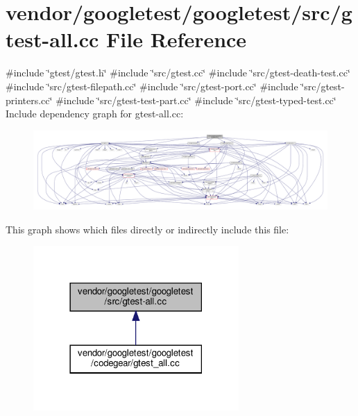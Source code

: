 \hypertarget{gtest-all_8cc}{}\section{vendor/googletest/googletest/src/gtest-\/all.cc File Reference}
\label{gtest-all_8cc}
{\ttfamily \#include \char`\"{}gtest/gtest.\+h\char`\"{}}\newline
{\ttfamily \#include \char`\"{}src/gtest.\+cc\char`\"{}}\newline
{\ttfamily \#include \char`\"{}src/gtest-\/death-\/test.\+cc\char`\"{}}\newline
{\ttfamily \#include \char`\"{}src/gtest-\/filepath.\+cc\char`\"{}}\newline
{\ttfamily \#include \char`\"{}src/gtest-\/port.\+cc\char`\"{}}\newline
{\ttfamily \#include \char`\"{}src/gtest-\/printers.\+cc\char`\"{}}\newline
{\ttfamily \#include \char`\"{}src/gtest-\/test-\/part.\+cc\char`\"{}}\newline
{\ttfamily \#include \char`\"{}src/gtest-\/typed-\/test.\+cc\char`\"{}}\newline
Include dependency graph for gtest-\/all.cc\+:
\nopagebreak
\begin{figure}[H]
\begin{center}
\leavevmode
\includegraphics[width=350pt]{gtest-all_8cc__incl}
\end{center}
\end{figure}
This graph shows which files directly or indirectly include this file\+:
\nopagebreak
\begin{figure}[H]
\begin{center}
\leavevmode
\includegraphics[width=222pt]{gtest-all_8cc__dep__incl}
\end{center}
\end{figure}
